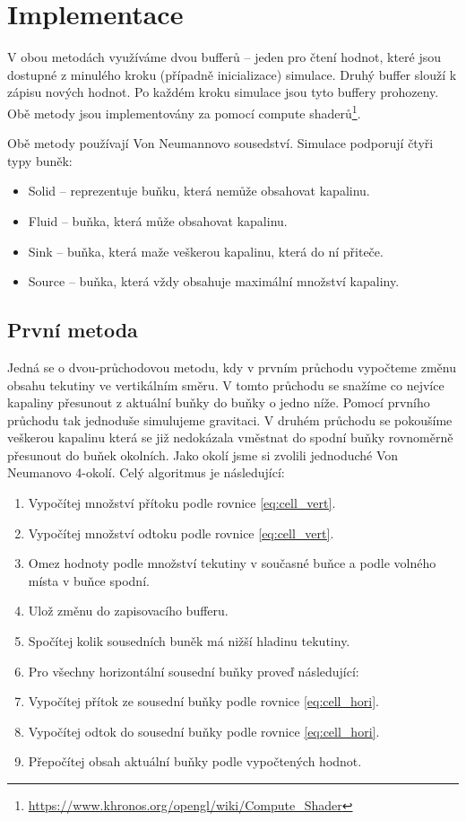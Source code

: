 \documentclass[12pt,a4paper,titlepage,final]{report}
\begin{document}
\section{Implementace}
V obou metodách využíváme dvou bufferů -- jeden pro čtení hodnot, které jsou dostupné z minulého kroku (případně inicializace) simulace. Druhý buffer slouží k zápisu nových hodnot. Po každém kroku simulace jsou tyto buffery prohozeny. Obě metody jsou implementovány za pomocí compute shaderů\footnote{\url{https://www.khronos.org/opengl/wiki/Compute_Shader}}.

Obě metody používají Von Neumannovo sousedství. Simulace podporují čtyři typy buněk:
\begin{itemize}
    \item Solid -- reprezentuje buňku, která nemůže obsahovat kapalinu.
    \item Fluid -- buňka, která může obsahovat kapalinu.
    \item Sink -- buňka, která maže veškerou kapalinu, která do ní přiteče.
    \item Source -- buňka, která vždy obsahuje maximální množství kapaliny.
\end{itemize}

\subsection{První metoda}
Jedná se o dvou-průchodovou metodu, kdy v prvním průchodu vypočteme změnu obsahu tekutiny ve vertikálním směru. V tomto průchodu se snažíme co nejvíce kapaliny přesunout z aktuální buňky do buňky o jedno níže. Pomocí prvního průchodu tak jednoduše simulujeme gravitaci. V druhém průchodu se pokoušíme veškerou kapalinu která se již nedokázala vměstnat do spodní buňky rovnoměrně přesunout do buňek okolních. Jako okolí jsme si zvolili jednoduché Von Neumanovo 4-okolí. Celý algoritmus je následující:
\begin{enumerate}
    \item Vypočítej množství přítoku podle rovnice \ref{eq:cell_vert}.
    \item Vypočítej množství odtoku podle rovnice \ref{eq:cell_vert}.
    \item Omez hodnoty podle množství tekutiny v současné buňce a podle volného místa v buňce spodní.
    \item Ulož změnu do zapisovacího bufferu.
    \item Spočítej kolik sousedních buněk má nižší hladinu tekutiny.
    \item Pro všechny horizontální sousední buňky proveď následující:
    \item Vypočítej přítok ze sousední buňky podle rovnice \ref{eq:cell_hori}.
    \item Vypočítej odtok do sousední buňky podle rovnice \ref{eq:cell_hori}.
    \item Přepočítej obsah aktuální buňky podle vypočtených hodnot.
\end{enumerate}
\end{document}
